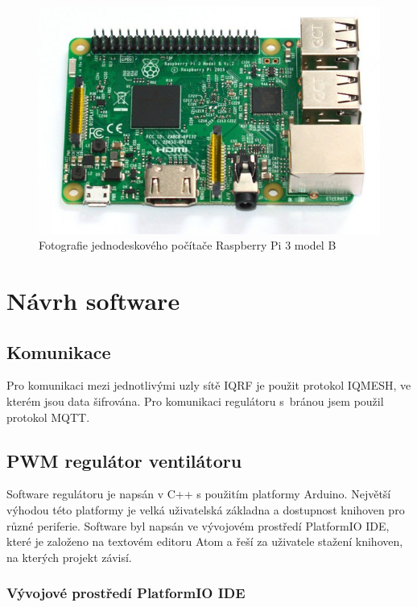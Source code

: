 \documentclass[12pt,a4paper]{article}
\begin{document}
\begin{figure}[H]
\centering
\label{fig:foto/rpi3}
\includegraphics[width = 128mm]{img/foto/rpi3.jpg}
\caption{Fotografie jednodeskového počítače Raspberry Pi 3 model B}
\end{figure}

\newpage

\section{Návrh software}

\subsection{Komunikace}

Pro komunikaci mezi jednotlivými uzly sítě IQRF je použit protokol IQMESH, ve kterém jsou data šifrována. Pro komunikaci regulátoru s~bránou jsem použil protokol MQTT.

\subsection{PWM regulátor ventilátoru}

Software regulátoru je napsán v C++ s použitím platformy Arduino. Největší výhodou této platformy je velká uživatelská základna a dostupnost knihoven pro různé periferie. Software byl napsán ve vývojovém prostředí PlatformIO IDE\cite{sw/platformio-ide}, které je založeno na textovém editoru Atom\cite{sw/atom} a řeší za uživatele stažení knihoven, na kterých projekt závisí.

\subsubsection{Vývojové prostředí PlatformIO IDE}
\end{document}
